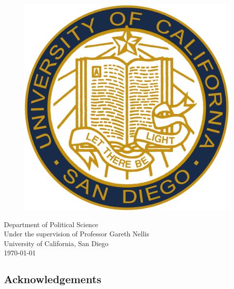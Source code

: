 \documentclass[12pt]{article}
\begin{document}
\begin{titlepage}
\vfill
\begin{figure}[H]
\begin{center}
\includegraphics[width = .2\textwidth]{ucsd_seal.png}
\end{center}
\end{figure}

\begin{center}	
Department of Political Science\\
Under the supervision of Professor Gareth Nellis\\
University of California, San Diego\\
\today
\end{center}

\end{titlepage}


\tableofcontents

\listoffigures

\listoftables

\pagebreak


\begin{center}\section*{Acknowledgements}\end{center}


\end{document}
